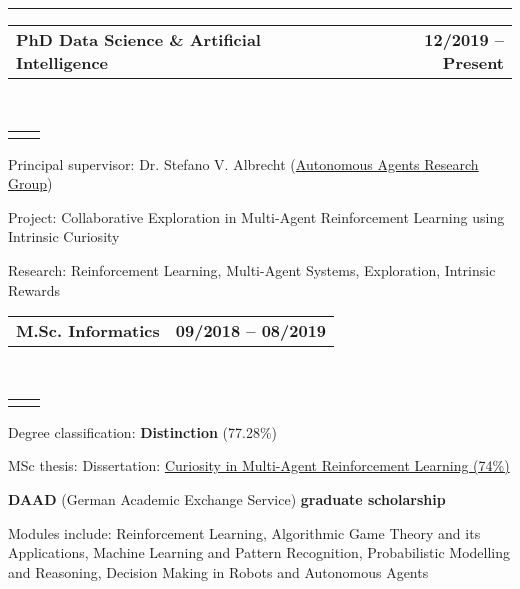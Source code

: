 \documentclass[]{lukas-cv-openfont}
\makeatletter
\newcommand{\headerrow}[2]
{\begin{tabular*}{\linewidth}{l@{\extracolsep{\fill}}r}
	\fontspec{Helvetica}\fontsize{12pt}{12pt}\selectfont\bfseries{\color{subheadings}#1} &
	\fontspec{Helvetica}\fontsize{12pt}{12pt}\selectfont\bfseries{\color{subheadings}#2} \\
\end{tabular*}}
\newcommand{\locationrow}[2]
{\begin{tabular*}{\linewidth}{l@{\extracolsep{\fill}}r}
        \color{headings}\scshape\fontspec{Heiti TC Medium}\fontsize{10pt}{12pt}\selectfont{#1}  &
        \color{headings}\scshape\fontspec{Heiti TC Medium}\fontsize{10pt}{12pt}\selectfont{#2}  \\
\end{tabular*}}
\makeatother
\begin{document}


\hrule
\vspace{0.4em}

\noindent
\headerrow{PhD Data Science \& Artificial Intelligence}{12/2019 -- Present}
\\
\locationrow{University of Edinburgh}{Edinburgh, United Kingdom}
\begin{tightitemize}{1.7em}
    \item Principal supervisor: Dr. Stefano V. Albrecht (\href{https://agents.inf.ed.ac.uk}{Autonomous Agents Research Group})
    \item Project: Collaborative Exploration in Multi-Agent Reinforcement Learning using Intrinsic Curiosity
    \item Research: Reinforcement Learning, Multi-Agent Systems, Exploration, Intrinsic Rewards
\end{tightitemize}
\largesectionsep

\noindent
\headerrow{M.Sc. Informatics}{09/2018 -- 08/2019}
\\
\locationrow{University of Edinburgh}{Edinburgh, United Kingdom}
\begin{tightitemize}{1.7em}
    \item Degree classification: \textbf{Distinction} (77.28\%)
    \item MSc thesis: Dissertation: \href{https://www.lukaschaefer.de/assets/files/msc_thesis.pdf}{Curiosity in Multi-Agent Reinforcement Learning (74\%)}
    \item \textbf{DAAD} (German Academic Exchange Service) \textbf{graduate scholarship}
    \item Modules include: Reinforcement Learning, Algorithmic Game Theory and its Applications, Machine Learning and 
    Pattern Recognition, Probabilistic Modelling and Reasoning, Decision Making in Robots and Autonomous Agents
\end{tightitemize}
\largesectionsep
\end{document}
